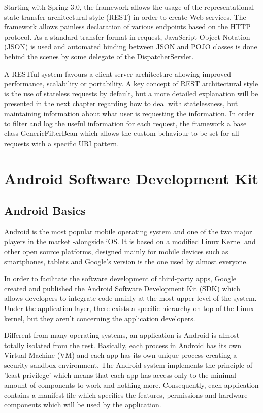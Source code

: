 Starting with Spring 3.0, the framework allows the usage of the representational state transfer architectural style (REST) in order to create Web services. The framework allows painless declaration of various endpoints based on the HTTP protocol. As a standard transfer format in request, JavaScript Object Notation (JSON) is used and automated binding between JSON and POJO classes is done behind the scenes by some delegate of the DispatcherServlet.

A RESTful system favours a client-server architecture allowing improved performance, scalability or portability. A key concept of REST architectural style is the use of stateless requests by default, but a more detailed explanation will be presented in the next chapter regarding how to deal with statelessness, but maintaining information about what user is requesting the information. In order to filter and log the useful information for each request, the framework a base class GenericFilterBean which allows the custom behaviour to be set for all requests with a specific URI pattern.


\section{Android Software Development Kit}

\subsection*{Android Basics}

Android is the most popular mobile operating system and one of the two major players in the market -alongside iOS. It is based on a modified Linux Kernel and other open source platforms, designed mainly for mobile devices such as smartphones, tablets and Google's version is the one used by almost everyone.

In order to facilitate the software development of third-party apps, Google created and published the Android Software Development Kit (SDK) which allows developers to integrate code mainly at the most upper-level of the system. Under the application layer, there exists a specific hierarchy on top of the Linux kernel, but they aren't concerning the application developers.

Different from many operating systems, an application is Android is almost totally isolated from the rest. Basically, each process in Android has its own Virtual Machine (VM) and each app has its own unique process creating a security sandbox environment. The Android system implements the principle of 'least privilege' which means that each app has access only to the minimal amount of components to work and nothing more. Consequently, each application contains a manifest file which specifies the features, permissions and hardware components which will be used by the application. 

